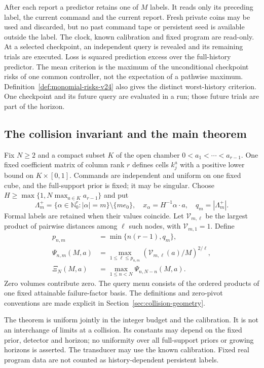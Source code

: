 After each report a predictor retains one of $M$ labels. It reads only
its preceding label, the current command and the current report.
Fresh private coins may be used and discarded, but no past command
tape or persistent seed is available outside the label. The clock,
known calibration and fixed program are read-only. At a selected
checkpoint, an independent query is revealed and its remaining trials
are executed. Loss is squared prediction excess over the full-history
predictor. The mean criterion is the maximum of the unconditional
checkpoint risks of one common controller, not the expectation of a
pathwise maximum. Definition~\ref{def:monomial-risks-v24} also gives
the distinct worst-history criterion. One checkpoint and its future
query are evaluated in a run; those future trials are part of the horizon.

\subsection{The collision invariant and the main theorem}
Fix $N\ge2$ and a compact subset $K$ of the open chamber
$0<a_1<\cdots<a_{r-1}$. One fixed coefficient matrix of column rank
$r$ defines cells $k_j^a$ with a positive lower bound on
$K\times[0,1]$. Commands are independent and uniform on one fixed
cube, and the full-support prior is fixed; it may be singular. Choose
$H\ge\max\{1,N\max_{a\in K}a_{r-1}\}$ and put
\[
 \Lambda_m^+=\{\alpha\in\mathbb N_0^r:|\alpha|=m\}\setminus\{me_0\},
 \quad x_\alpha=H^{-1}\alpha\cdot a,\quad q_m=|\Lambda_m^+|.
\]
Formal labels are retained when their values coincide. Let
$\mathcal V_{m,\ell}$ be the largest product of pairwise distances
among $\ell$ such nodes, with $\mathcal V_{m,1}=1$. Define
\[
 \begin{split}
 p_{n,m}&=\min\{n(r-1),q_m\},\\
 \Psi_{n,m}(M,a)&=\max_{1\le\ell\le p_{n,m}}
                   (\mathcal V_{m,\ell}(a)/M)^{2/\ell},\\
 \Xi_N(M,a)&=\max_{1\le n<N}\Psi_{n,N-n}(M,a).
 \end{split}
\]
Zero volumes contribute zero. The query menu consists of the ordered
products of one fixed attainable failure-factor basis. The definitions
and zero-pivot conventions are made explicit in
Section~\ref{sec:collision-geometry}.



The theorem is uniform jointly in the integer budget and the calibration.
It is not an interchange of limits at a collision. Its constants may
depend on the fixed prior, detector and horizon; no uniformity over all
full-support priors or growing horizons is asserted. The transducer
may use the known calibration. Fixed real program data are not counted
as history-dependent persistent labels.

